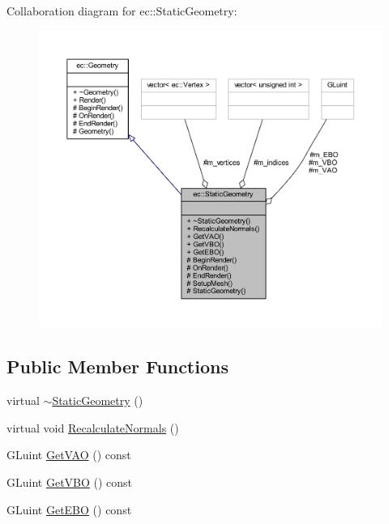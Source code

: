 Collaboration diagram for ec\+:\+:Static\+Geometry\+:
\nopagebreak
\begin{figure}[H]
\begin{center}
\leavevmode
\includegraphics[width=350pt]{classec_1_1_static_geometry__coll__graph}
\end{center}
\end{figure}
\subsection*{Public Member Functions}
\begin{DoxyCompactItemize}
\item 
virtual \mbox{\hyperlink{classec_1_1_static_geometry_a47d1f09c1042762be9a9d4a492db2366}{$\sim$\+Static\+Geometry}} ()
\item 
virtual void \mbox{\hyperlink{classec_1_1_static_geometry_a5e353f9962bb222229c59658097a129a}{Recalculate\+Normals}} ()
\item 
G\+Luint \mbox{\hyperlink{classec_1_1_static_geometry_ae82f6d9fbad1e36e7bd97ed0aac94134}{Get\+V\+AO}} () const
\item 
G\+Luint \mbox{\hyperlink{classec_1_1_static_geometry_a395f7523179090b1d42e176b40cc996b}{Get\+V\+BO}} () const
\item 
G\+Luint \mbox{\hyperlink{classec_1_1_static_geometry_aafa07962d6488eb976146bc7d6351ec1}{Get\+E\+BO}} () const
\end{DoxyCompactItemize}

